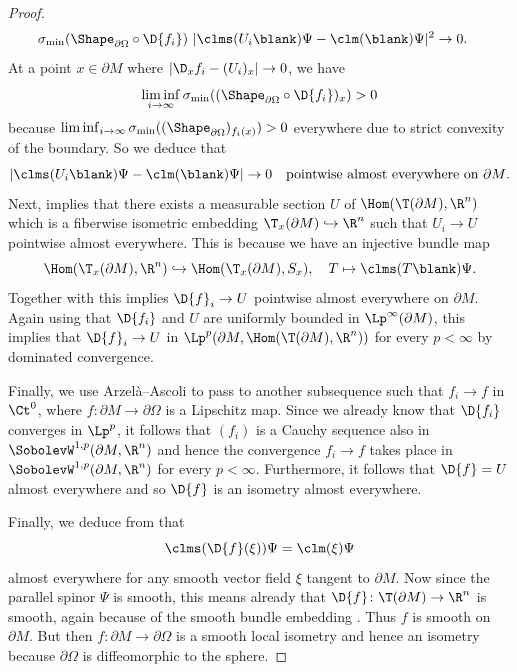 \documentclass[a4paper,11pt]{amsart}
\numberwithin{equation}{section}
\begin{document}
\begin{proof}
\begin{align}
        \sigma_{\min}(\Shape_{\partial\Omega} \circ \D{f_i})\ | \clms(U_i \blank) \Psi - \clm(\blank)\Psi|^2 &\to 0. \nonumber
    \end{align}
    At a point \(x \in \partial M\) where \(|\D_x{f_i} - (U_i)_x | \to 0\), we have 
    \[\liminf_{i \to \infty} \sigma_{\min}((\Shape_{\partial\Omega} \circ \D{f_i})_x) > 0 \]
    because \(\liminf_{i \to \infty} \sigma_{\min}((\Shape_{\partial \Omega})_{f_i(x)}) > 0\) everywhere due to strict convexity of the boundary. 
    So we deduce that
    \begin{equation}
        |  \clms(U_i \blank) \Psi - \clm(\blank)\Psi | \to 0 \quad \text{pointwise almost everywhere on \(\partial M\).}\label{eq:clifford_action_convergence}
    \end{equation}
    Next,  implies that there exists a measurable section \(U\) of \(\Hom(\T (\partial M), \R^n)\) which is a fiberwise isometric embedding \(\T_x(\partial M) \hookrightarrow \R^n\) such that \(U_i \to U\) pointwise almost everywhere.
    This is because we have an injective bundle map 
    \begin{equation}
         \Hom(\T_x(\partial M) , \R^n) \hookrightarrow \Hom(\T_x(\partial M), S_x), \quad T \mapsto \clms(T \blank) \Psi.  \label{eq:bundle_embedding}
    \end{equation}
    Together with  this implies \(\D{f}_i \to U\) pointwise almost everywhere on \(\partial M\).
    Again using that \(\D{f_i}\) and \(U\) are uniformly bounded in \(\Lp^\infty(\partial M)\), this implies that \(\D{f}_i \to U\) in \(\Lp^p(\partial M, \Hom(\T (\partial M) , \R^n))\) for every \(p < \infty\) by dominated convergence.
    
    Finally, we use Arzelà--Ascoli to pass to another subsequence such that \(f_i \to f\) in \(\Ct^0\), where \(f \colon \partial M \to \partial \Omega\) is a Lipschitz map.
    Since we already know that \(\D{f_i}\) converges in \(\Lp^p\), it follows that \((f_i)\) is a Cauchy sequence also in \(\SobolevW^{1,p}(\partial M, \R^n)\) and hence the convergence \(f_i \to f\) takes place in \(\SobolevW^{1,p}(\partial M, \R^n)\) for every \(p < \infty\).
    Furthermore, it follows that \(\D{f} = U\) almost everywhere and so \(\D{f}\) is an isometry almost everywhere. 
    
    Finally, we deduce from  that
    \begin{equation} 
        \clms(\D{f}(\xi)) \Psi = \clm(\xi) \Psi \label{eq:clifford_action}
    \end{equation}
    almost everywhere for any smooth vector field \(\xi\) tangent to \(\partial M\).
    Now since the parallel spinor \(\Psi\) is smooth, this means already that \(\D{f} \colon \T (\partial M) \to \R^n\) is smooth, again because of the smooth bundle embedding .
    Thus \(f\) is smooth on \(\partial M\).
    But then \(f \colon \partial M \to \partial \Omega\) is a smooth local isometry and hence an isometry because \(\partial \Omega\) is diffeomorphic to the sphere.
    

\end{proof}
\end{document}
